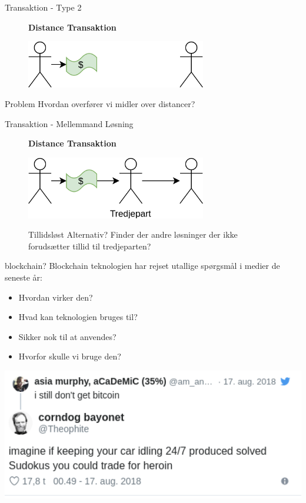 \documentclass[12pt,t]{beamer}
\begin{document}
\begin{frame}[c]{Transaktion - Type 2}
\begin{figure}
	\centering
	\textbf{Distance Transaktion}\par\medskip
	\includegraphics[width=0.7\textwidth]{b_ill2.png}
\end{figure}
\pause
\begin{block}{Problem}
	Hvordan overfører vi midler over distancer?
\end{block}
\end{frame}

\begin{frame}[c]{Transaktion - Mellemmand Løsning}
\begin{figure}
	\centering
	\textbf{Distance Transaktion}\par\medskip
	\includegraphics[width=0.7\textwidth]{b_ill3.png}
	\pause 
	\begin{block}{Tillidsløst Alternativ?}
		Finder der andre løsninger der ikke forudsætter tillid til tredjeparten?
	\end{block}
\end{figure}
\end{frame}

\begin{frame}[c]{blockchain?}
Blockchain teknologien har rejset utallige spørgsmål i medier de seneste år:
\begin{itemize}
	\item Hvordan virker den?
	\item Hvad kan teknologien bruges til?
	\item Sikker nok til at anvendes?
	\item Hvorfor skulle vi bruge den?
\end{itemize}
\end{frame}
\begin{frame}[c]{}
\includegraphics[width=1\textwidth]{bit.png}
\end{frame}
\end{document}
